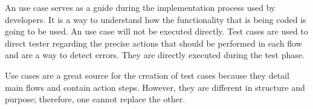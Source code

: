 An use case serves as a guide during the implementation process used by developers. It is a way to understand how the functionality that is being coded is going to be used. An use case will not be executed directly. Test cases are used to direct tester regarding the precise actions that should be performed in each flow and are a way to detect errors. They are directly executed during the test phase.

Use cases are a great source for the creation of test cases because they detail main flows and contain action steps. However, they are different in structure and purpose; therefore, one cannot replace the other.

